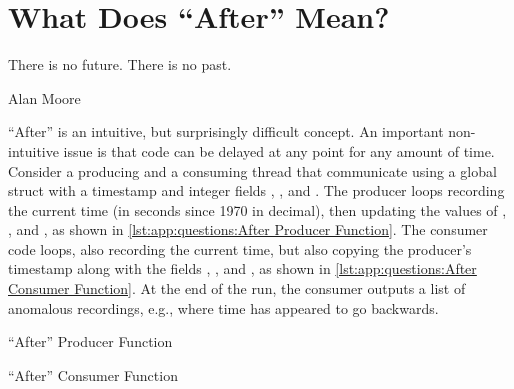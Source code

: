 
\section{What Does ``After'' Mean?}
\label{sec:app:questions:What Does ``After'' Mean?}
%
\epigraph{There is no future.
	  There is no past.}
	 {Alan Moore}

``After'' is an intuitive, but surprisingly difficult concept.
An important non-intuitive issue is that code can be delayed at
any point for any amount of time.
Consider a producing and a consuming thread that communicate using
a global struct with a timestamp  and integer fields , ,
and .
The producer loops recording the current time
(in seconds since 1970 in decimal),
then updating the values of , , and ,
as shown in \cref{lst:app:questions:After Producer Function}.
The consumer code loops, also recording the current time, but also
copying the producer's timestamp along with the fields ,
, and , as shown in
\cref{lst:app:questions:After Consumer Function}.
At the end of the run, the consumer outputs a list of anomalous recordings,
e.g., where time has appeared to go backwards.

\begin{listing}

\caption{``After'' Producer Function}
\label{lst:app:questions:After Producer Function}
\end{listing}

\begin{listing}
\caption{``After'' Consumer Function}
\label{lst:app:questions:After Consumer Function}
\end{listing}

\QuickQuizEnd

